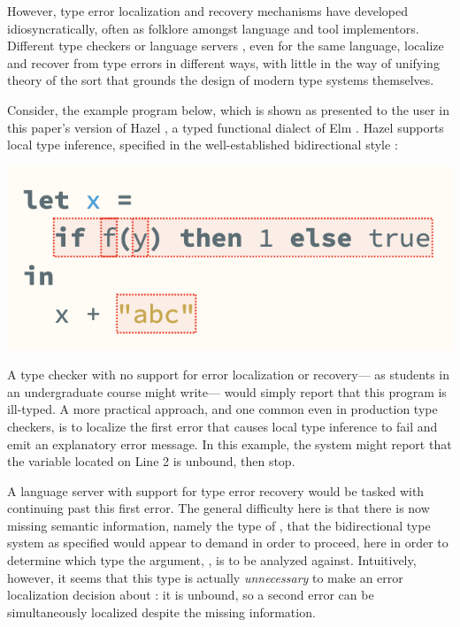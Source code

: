 However, type error localization and recovery mechanisms have developed idiosyncratically, 
often as folklore amongst language and tool implementors. 
Different type checkers or language servers \cite{langauge-servers,merlin}, even for the same language, localize and recover from type errors in different ways, 
with little in the way of unifying theory of the sort that grounds the design of modern type systems themselves.

Consider, the example program below, which is shown as presented to the user in
this paper's version of Hazel \cite{hazel}, a typed functional dialect of Elm \cite{elm}. Hazel  
supports local type inference, specified in the well-established bidirectional style \cite{pierce,hazelnut,BidirTyping}:

\begin{center}
    \includegraphics[scale=0.5]{images/hazel-intro-screenshot.png}
\end{center}

A type checker with no support for error localization or recovery---%
as students in an undergraduate course might write---%
would simply report that this program is ill-typed. 
A more practical approach, and one common even in production type checkers, 
is to localize the first error that causes local type inference to fail and emit an explanatory error message.
In this example, the system might report that the variable  located on Line 2 is unbound, then stop.

A language server with support for type error recovery would 
 be tasked with continuing past this first error.
 The general difficulty here is that there is now missing semantic information, namely the type of , that 
 the bidirectional type system as specified 
 would appear to demand in order to proceed, here in order to determine which type the argument, , is to be analyzed against.
 Intuitively, however, it seems that this type is actually \emph{unnecessary} to make an error localization decision about : 
it is unbound, so a second error can be simultaneously localized despite the missing information.

